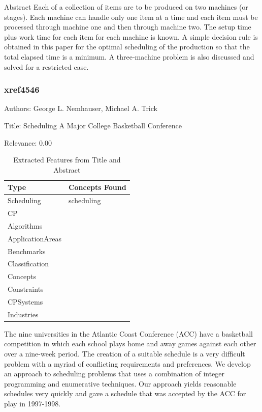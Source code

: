  Abstract  Each of a collection of items are to be produced on two machines (or stages). Each machine can handle only one item at a time and each item must be processed through machine one and then through machine two. The setup time plus work time for each item for each machine is known. A simple decision rule is obtained in this paper for the optimal scheduling of the production so that the total elapsed time is a minimum. A three‐machine problem is also discussed and solved for a restricted case. 

\subsubsection{xref4546}
\label{mw:xref4546}

Authors: George L. Nemhauser, Michael A. Trick

Title: Scheduling A Major College Basketball Conference

Relevance:  0.00

{\scriptsize
\begin{longtable}{p{2cm}p{20cm}}
\caption{Extracted Features from Title and Abstract}\\ \toprule
Type & Concepts Found\\ \midrule
\endhead
\bottomrule
\endfoot
Scheduling & scheduling\\ 
CP & \\ 
Algorithms & \\ 
ApplicationAreas & \\ 
Benchmarks & \\ 
Classification & \\ 
Concepts & \\ 
Constraints & \\ 
CPSystems & \\ 
Industries & \\ 
\end{longtable}
}

  The nine universities in the Atlantic Coast Conference (ACC) have a basketball competition in which each school plays home and away games against each other over a nine-week period. The creation of a suitable schedule is a very difficult problem with a myriad of conflicting requirements and preferences. We develop an approach to scheduling problems that uses a combination of integer programming and enumerative techniques. Our approach yields reasonable schedules very quickly and gave a schedule that was accepted by the ACC for play in 1997-1998.  

